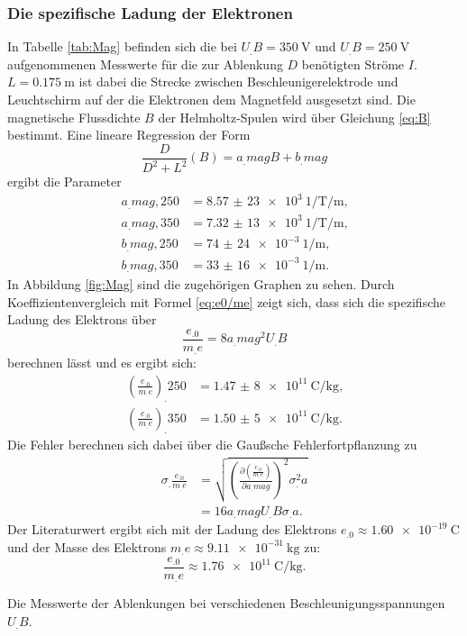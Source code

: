 \subsubsection{Die spezifische Ladung der Elektronen}
In Tabelle \ref{tab:Mag} befinden sich die bei $U_.B=\SI{350}{\volt}$ und $U_.B=\SI{250}{\volt}$ aufgenommenen Messwerte für die zur Ablenkung $D$ benötigten Ströme $I$.
$L=\SI{0,175}{\metre}$\cite{V501} ist dabei die Strecke zwischen Beschleunigerelektrode und Leuchtschirm auf der die Elektronen dem Magnetfeld ausgesetzt sind.
Die magnetische Flussdichte $B$ der Helmholtz-Spulen wird über Gleichung \eqref{eq:B} bestimmt.
Eine lineare Regression der Form \[\frac{D}{D^2+L^2}(B)=a_.{mag}B+b_.{mag}\] ergibt die Parameter
\begin{align*}
a_.{mag,250}&=\SI{8,57(23)e3}{1\per\tesla\per\metre}\text{,}\\
a_.{mag,350}&=\SI{7,32(13)e3}{1\per\tesla\per\metre}\text{,}\\
b_.{mag,250}&=\SI{74(24)e-3}{1\per\metre}\text{,}\\
b_.{mag,350}&=\SI{33(16)e-3}{1\per\metre}\text{.}
\end{align*}
In Abbildung \ref{fig:Mag} sind die zugehörigen Graphen zu sehen.
Durch Koeffizientenvergleich mit Formel \eqref{eq:e0/me} zeigt sich, dass sich die spezifische Ladung des Elektrons über
\[
\frac{e_.0}{m_.e}=8a_.{mag}^2U_.B
\]
berechnen lässt und es ergibt sich: 
\begin{align*}
\left(\frac{e_.0}{m_.e}\right)_.{250}&=\SI{1,47(8)e11}{\coulomb\per\kilogram}\text{,}\\
\left(\frac{e_.0}{m_.e}\right)_.{350}&=\SI{1,50(5)e11}{\coulomb\per\kilogram}\text{.}
\end{align*}
Die Fehler berechnen sich dabei über die Gaußsche Fehlerfortpflanzung zu
\begin{align*}
\sigma_.{\frac{e_.0}{m_.e}}&=\sqrt{\left(\frac{\partial\left(\frac{e_.0}{m_.e}\right)}{\partial a_.{mag}}\right)^2\sigma^2_.a}\\
                           &=16a_.{mag}U_.B\sigma_.a\text{.}
\end{align*}
Der Literaturwert ergibt sich mit der Ladung des Elektrons $e_.0\approx\SI{1,60e-19}{\coulomb}$ \cite{nistgov} und der Masse des Elektrons $m_.e\approx\SI{9,11e-31}{\kilogram}$ \cite{nistgov} zu: 
\[
\frac{e_.0}{m_.e}\approx\SI{1,76e11}{\coulomb\per\kilogram}\text{.}
\]
\begin{table}
\centering
\caption{Die Messwerte der Ablenkungen bei verschiedenen Beschleunigungsspannungen $U_.B$.}

\label{tab:Mag}
\end{table}
